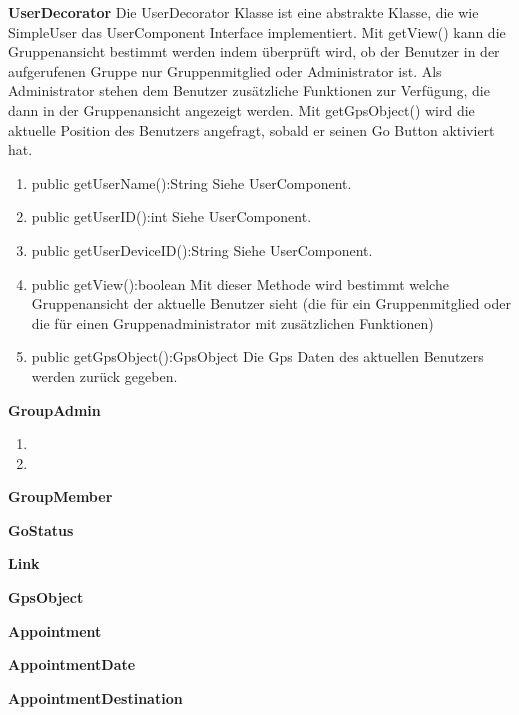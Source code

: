 \textbf{UserDecorator}
Die UserDecorator Klasse ist eine abstrakte Klasse, die wie SimpleUser das UserComponent Interface implementiert. 
Mit getView() kann die Gruppenansicht bestimmt werden indem überprüft wird, ob der Benutzer in der aufgerufenen Gruppe nur Gruppenmitglied oder Administrator ist. Als Administrator stehen dem Benutzer zusätzliche Funktionen zur Verfügung, die dann in der Gruppenansicht angezeigt werden.
Mit getGpsObject() wird die aktuelle Position des Benutzers angefragt, sobald er seinen Go Button aktiviert hat.
\begin{enumerate}
	\item public getUserName():String
	Siehe UserComponent.
	\item public getUserID():int
	Siehe UserComponent.
	\item public getUserDeviceID():String
	Siehe UserComponent.
	\item public getView():boolean
	Mit dieser Methode wird bestimmt welche Gruppenansicht der aktuelle Benutzer sieht (die für ein Gruppenmitglied oder die für einen Gruppenadministrator mit zusätzlichen Funktionen)
	\item public getGpsObject():GpsObject
	Die Gps Daten des aktuellen Benutzers werden zurück gegeben.
\end{enumerate}

\textbf{GroupAdmin}
\begin{enumerate}
	\item
	\item
\end{enumerate}

\textbf{GroupMember}


\textbf{GoStatus}

\textbf{Link}

\textbf{GpsObject}


\textbf{Appointment}

\textbf{AppointmentDate}

\textbf{AppointmentDestination}








